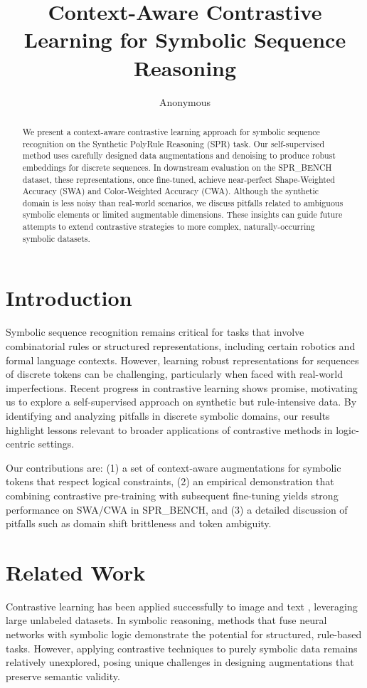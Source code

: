 \documentclass{article} %
\title{Context-Aware Contrastive Learning for Symbolic Sequence Reasoning}
\author{Anonymous}
\theoremstyle{plain}
\theoremstyle{definition}
\theoremstyle{remark}
\begin{document}
\maketitle

\begin{abstract}
We present a context-aware contrastive learning approach for symbolic sequence recognition on the Synthetic PolyRule Reasoning (SPR) task. Our self-supervised method uses carefully designed data augmentations and denoising to produce robust embeddings for discrete sequences. In downstream evaluation on the SPR\_BENCH dataset, these representations, once fine-tuned, achieve near-perfect Shape-Weighted Accuracy (SWA) and Color-Weighted Accuracy (CWA). Although the synthetic domain is less noisy than real-world scenarios, we discuss pitfalls related to ambiguous symbolic elements or limited augmentable dimensions. These insights can guide future attempts to extend contrastive strategies to more complex, naturally-occurring symbolic datasets.
\end{abstract}

\section{Introduction}
Symbolic sequence recognition remains critical for tasks that involve combinatorial rules or structured representations, including certain robotics and formal language contexts. However, learning robust representations for sequences of discrete tokens can be challenging, particularly when faced with real-world imperfections. Recent progress in contrastive learning \citep{chen2020asf} shows promise, motivating us to explore a self-supervised approach on synthetic but rule-intensive data. By identifying and analyzing pitfalls in discrete symbolic domains, our results highlight lessons relevant to broader applications of contrastive methods in logic-centric settings.

Our contributions are: (1) a set of context-aware augmentations for symbolic tokens that respect logical constraints, (2) an empirical demonstration that combining contrastive pre-training with subsequent fine-tuning yields strong performance on SWA/CWA in SPR\_BENCH, and (3) a detailed discussion of pitfalls such as domain shift brittleness and token ambiguity.

\section{Related Work}
Contrastive learning has been applied successfully to image and text \citep{chen2020asf, choi2025similarityguideddf, kim2024semisupervisedcl}, leveraging large unlabeled datasets. In symbolic reasoning, methods that fuse neural networks with symbolic logic \citep{pulicharla2025neurosymbolicab, zhang2023improvedlr} demonstrate the potential for structured, rule-based tasks. However, applying contrastive techniques to purely symbolic data remains relatively unexplored, posing unique challenges in designing augmentations that preserve semantic validity.
\end{document}
